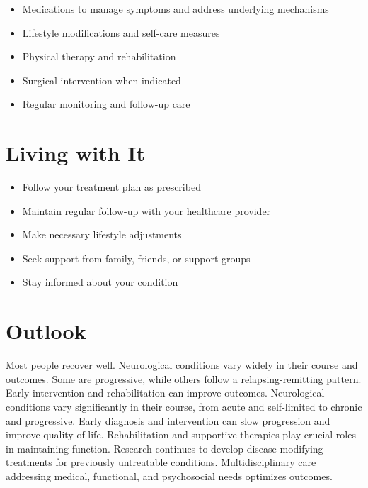 \begin{itemize}[noitemsep]
  \item Medications to manage symptoms and address underlying mechanisms
  \item Lifestyle modifications and self-care measures
  \item Physical therapy and rehabilitation
  \item Surgical intervention when indicated
  \item Regular monitoring and follow-up care
\end{itemize}
\section{Living with It}
\begin{itemize}[noitemsep]
  \item Follow your treatment plan as prescribed
  \item Maintain regular follow-up with your healthcare provider
  \item Make necessary lifestyle adjustments
  \item Seek support from family, friends, or support groups
  \item Stay informed about your condition
\end{itemize}
\section{Outlook}
Most people recover well. Neurological conditions vary widely in their course and outcomes. Some are progressive, while others follow a relapsing-remitting pattern. Early intervention and rehabilitation can improve outcomes. Neurological conditions vary significantly in their course, from acute and self-limited to chronic and progressive. Early diagnosis and intervention can slow progression and improve quality of life. Rehabilitation and supportive therapies play crucial roles in maintaining function. Research continues to develop disease-modifying treatments for previously untreatable conditions. Multidisciplinary care addressing medical, functional, and psychosocial needs optimizes outcomes.
